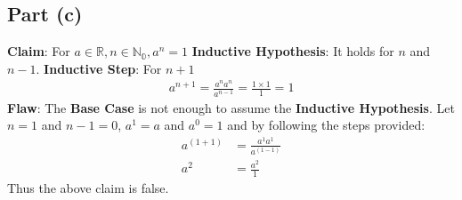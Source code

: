 \documentclass{article}
\begin{document}
{  \subsection{Part (c)}{
    \textbf{Claim}: For $a \in \mathbb{R},n \in \mathbb{N_0}, a^n=1$ \newline
    \textbf{Inductive Hypothesis}: It holds for $n$ and $n-1$. \newline
    \textbf{Inductive Step}: For $n+1$
    \begin{align*}
      a^{n+1}=\frac{a^na^n}{a^{n-1}}=\frac{1\times1}{1}=1
    \end{align*}
    \textbf{Flaw}: The \textbf{Base Case} is not enough to assume the \textbf{Inductive Hypothesis}. \newline
    Let $n=1$ and $n-1=0$, $a^1=a$ and $a^0=1$ and by following the steps provided:
    \begin{align*}
      a^{(1+1)}&=\frac{a^1a^1}{a^{(1-1)}} \\
      a^2&=\frac{a^2}{1}
    \end{align*}
    Thus the above claim is false.
  }
}
\end{document}
